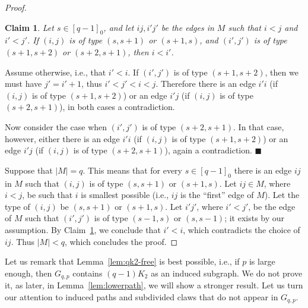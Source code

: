 \documentclass[11pt,a4paper]{article}
\theoremstyle{mystyle}
\newtheorem{claim}{Claim}[theorem]
\newenvironment{claimproof}{\noindent {\emph{Proof of Claim.}}}{\hfill$\blacksquare$\medskip}
\begin{document}
\begin{proof}
\begin{claim}\label{clm:ordering}
Let $s \in [q-1]_0$, and let $ij, i'j'$ be the edges in $M$ such that $i <j$ and $i'<j'$.
    If $(i,j)$ is of type $(s,s+1)$ or $(s+1,s)$, and $(i',j')$ is of type $(s+1,s+2)$ or $(s+2,s+1)$, then $i <i'$.
\end{claim}
\begin{claimproof}
    Assume otherwise, i.e., that $i'<i$. If $(i',j')$ is of type $(s+1,s+2)$, then we must have $j'=i'+1$, thus $i'<j'<i<j$.
    Therefore there is an edge $i'i$ (if $(i,j)$ is of type $(s+1,s+2)$) or an edge $i'j$ (if $(i,j)$ is of type $(s+2,s+1)$), in both cases a contradiction.

    Now consider the case when $(i',j')$ is of type $(s+2,s+1)$. In that case, however, either there is an edge $i'i$ (if $(i,j)$ is of type $(s+1,s+2)$) or an edge $i'j$ (if $(i,j)$ is of type $(s+2,s+1)$), again a contradiction.
\end{claimproof}

Suppose that $|M|=q$. This means that for every $s \in [q-1]_0$ there is an edge $ij$ in $M$ such that $(i,j)$ is of type $(s,s+1)$ or $(s+1,s)$.
Let $ij \in M$, where $i < j$, be such that $i$ is smallest possible (i.e., $ij$ is the ``first'' edge of $M$).
Let the type of $(i,j)$ be $(s,s+1)$ or $(s+1,s)$.
Let $i'j'$, where $i' < j'$, be the edge of $M$ such that $(i',j')$ is of type $(s-1,s)$ or $(s,s-1)$; it exists by our assumption.
By Claim~\ref{clm:ordering}, we conclude that $i' < i$, which contradicts the choice of $ij$.
Thus $|M|<q$, which concludes the proof.
\end{proof}

Let us remark that Lemma~\ref{lem:qk2-free} is best possible, i.e., if $p$ is large enough, then $G_{q,p}$ contains $(q-1)K_2$ as an induced subgraph.
We do not prove it, as later, in Lemma~\ref{lem:lowerpath}, we will show a stronger result. 
Let us turn our attention to induced paths and subdivided claws that do not appear in $G_{q,p}$.
\end{document}
